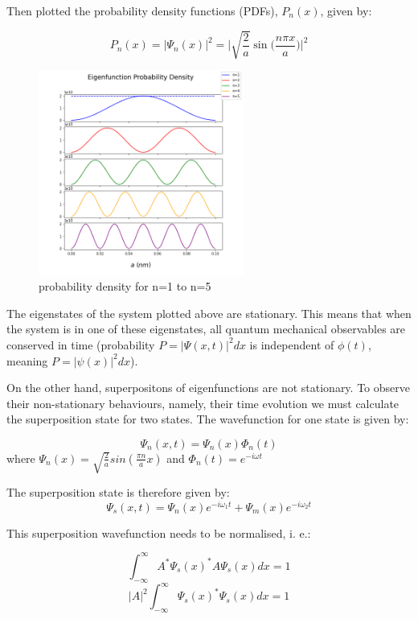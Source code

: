 Then plotted the probability density functions (PDFs), $P_n (x)$, given by:

$$P_n(x) = |\Psi_n(x)|^{2} = \Bigg|\sqrt{\frac{2}{a}}\sin\Big(\frac{n\pi x}{a}\Big)\Bigg|^{2}  $$

\begin{figure}[h]
    \centering
    \includegraphics[width=0.6\textwidth]{lab1/probabilityDensity.png} %
    \caption{probability density for n=1 to n=5}
    \label{fig:probDens}
\end{figure}

The eigenstates of the system plotted above are stationary. This means that when the system is in one of these eigenstates, all quantum mechanical observables are conserved in time (probability $P=|\Psi(x,t)|^2dx$ is independent of $\phi(t)$, meaning $P=|\psi(x)|^2dx$).

On the other hand, superpositons of eigenfunctions are not stationary. To observe their non-stationary behaviours, namely, their time evolution we must calculate the superposition state for two states. The wavefunction for one state is given by:

$$\Psi_n (x,t) = \Psi_n (x)\Phi_n (t)$$
where $\Psi_n (x)= \sqrt{\frac{2}{a}} sin(\frac{\pi n}{a}x)$ and $\Phi_n (t)= e^{-i \omega t}$

The superposition state is therefore given by:
\begin{equation} \label{eq:superPos}
\Psi_s (x,t) = \Psi_n (x)e^{-i \omega_{1} t} + \Psi_m (x)e^{-i \omega_{2} t}
\end{equation}


This superposition wavefunction needs to be normalised, i. e.:

$$\int_{ -\infty}^{\infty} A^{*} \Psi_s (x)^{*} A\Psi_s (x)dx = 1$$
$$\left | A \right |^2 \int_{ -\infty}^{\infty} \Psi_s (x)^{*} \Psi_s (x)dx = 1$$


